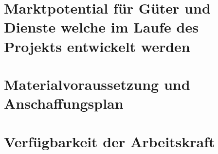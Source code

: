 \chapter{Marktpotential für Güter und Dienste welche im Laufe des Projekts entwickelt werden}

\chapter{Materialvoraussetzung und Anschaffungsplan}
\label{sec:Materialvoraussetzung_Anschaffungsplan}

\chapter{Verfügbarkeit der Arbeitskraft}
